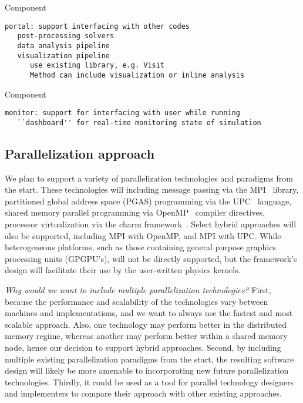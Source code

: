 \documentclass{article}
\begin{document}
 Component

\begin{verbatim}
portal: support interfacing with other codes
   post-processing solvers
   data analysis pipeline
   visualization pipeline
      use existing library, e.g. Visit
      Method can include visualization or inline analysis
\end{verbatim}

 Component

\begin{verbatim}
monitor: support for interfacing with user while running
   ``dashboard'' for real-time monitoring state of simulation
\end{verbatim}


\subsection{Parallelization approach} \label{ss:design-parallel}

We plan to support a variety of parallelization technologies and
paradigms from the start.  These technologies will including message
passing via the MPI~\cite{@@@MPI} library, partitioned global address
space (PGAS) programming via the UPC~\cite{@@@UPC} language, shared
memory parallel programming via OpenMP~\cite{@@@OpenMP} compiler
directives, processor virtualization via the charm
framework~\cite{@@@Charm}.  Select hybrid approaches will also be
supported, including MPI with OpenMP, and MPI with UPC.  While
heterogeneous platforms, such as those containing general purpose
graphics processing units (GPGPU's), will not be directly supported,
but the framework's design will facilitate their use by the
user-written physics kernels.

\textit{Why would we want to include multiple parallelization technologies?}
First, because the performance and scalability of the technologies
vary between machines and implementations, and we want to always use
the fastest and most scalable approach.  Also, one technology may
perform better in the distributed memory regime, whereas another may
perform better within a shared memory node, hence our decision to
support hybrid approaches.  Second, by including multiple existing
parallelization paradigms from the start, the resulting software
design will likely be more amenable to incorporating new future
parallelization technologies.  Thirdly, it could be used as a tool for
parallel technology designers and implementers to compare their
approach with other existing approaches.
\end{document}
